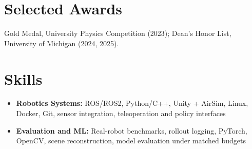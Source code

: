 \documentclass[11pt,letterpaper]{article}
\newcommand{\resumeItem}[1]{
    \item #1
}
\begin{document}
\section*{Selected Awards}
\small Gold Medal, University Physics Competition (2023); Dean's Honor List, University of Michigan (2024, 2025).
\section*{Skills}
\begin{itemize}[leftmargin=2.4em, itemsep=0.5pt, topsep=0pt]
\small
\resumeItem{\textbf{Robotics Systems:} ROS/ROS2, Python/C++, Unity + AirSim, Linux, Docker, Git, sensor integration, teleoperation and policy interfaces}
\resumeItem{\textbf{Evaluation and ML:} Real-robot benchmarks, rollout logging, PyTorch, OpenCV, scene reconstruction, model evaluation under matched budgets}
\end{itemize}
\end{document}
